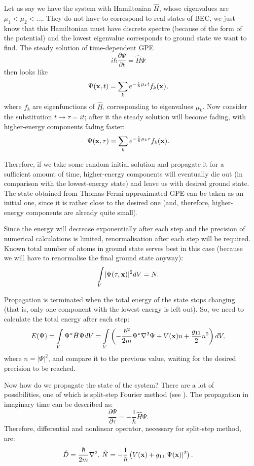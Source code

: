 Let us say we have the system with Hamiltonian $\hat{H}$, whose eigenvalues are $\mu_1 < \mu_2 < ...$.
They do not have to correspond to real states of BEC, we just know that this Hamiltonian must have discrete spectre
(because of the form of the potential) and the lowest eigenvalue corresponds to ground state we want to find.
The steady solution of time-dependent GPE
\[
	i \hbar \frac{\partial \Psi}{\partial t} = \hat{H} \Psi
\]
then looks like
\[
	\Psi(\mathbf{x}, t) = \sum_k e^{-\frac{i}{\hbar}\mu_k t} f_k(\mathbf{x}),
\]
where $f_k$ are eigenfunctions of $\hat{H}$, corresponding to eigenvalues $\mu_k$.
Now consider the substitution $t \rightarrow \tau = it$; after it the steady solution will become fading,
with higher-energy components fading faster:
\[
	\Psi(\mathbf{x}, \tau) = \sum_k e^{-\frac{1}{\hbar}\mu_k \tau} f_k(\mathbf{x}).
\]

Therefore, if we take some random initial solution and propagate it for a sufficient amount of time,
higher-energy components will eventually die out (in comparison with the lowest-energy state)
and leave us with desired ground state.
The state obtained from Thomas-Fermi approximated GPE can be taken as an initial one,
since it is rather close to the desired one (and, therefore, higher-energy components are already quite small).

Since the energy will decrease exponentially after each step and the precision of numerical calculations is limited,
renormalisation after each step will be required.
Known total number of atoms in ground state serves best in this case
(because we will have to renormalise the final ground state anyway):
\[
	\int\limits_V \lvert \Psi(\tau, \mathbf{x}) \rvert^2 dV = N.
\]

Propagation is terminated when the total energy of the state stops changing
(that is, only one component with the lowest energy is left out).
So, we need to calculate the total energy after each step:
\[
	E(\Psi) = \int\limits_V \Psi^* \hat{H} \Psi dV
	= \int\limits_V \left(
		-\frac{\hbar^2}{2 m} \Psi^* \nabla^2 \Psi + V(\mathbf{x}) n + \frac{g_{11}}{2} n^2
	\right) dV,
\]
where $n = \lvert \Psi \rvert^2$,
and compare it to the previous value, waiting for the desired precision to be reached.

Now how do we propagate the state of the system?
There are a lot of possibilities, one of which is split-step Fourier method (see ).
The propagation in imaginary time can be described as:
\[
	\frac{\partial \Psi}{\partial \tau} = - \frac{1}{\hbar} \hat{H} \Psi.
\]
Therefore, differential and nonlinear operator, necessary for split-step method, are:
\[
	\hat{D} = \frac{\hbar}{2 m}\nabla^2,\,
	\hat{N} = -\frac{1}{\hbar}\left( V(\mathbf{x}) + g_{11} \lvert \Psi(\mathbf{x}) \rvert^2 \right).
\]


